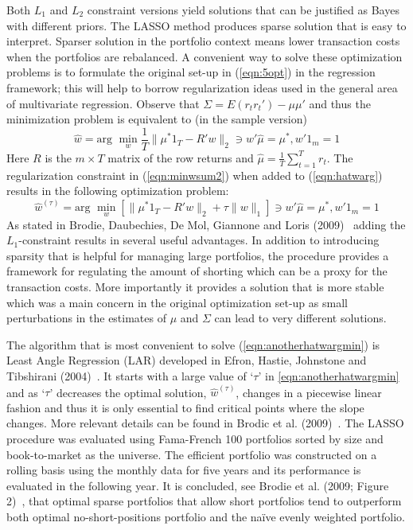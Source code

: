 Both $L_1$ and $L_2$ constraint versions yield solutions that can be justified as Bayes with different priors. The LASSO method produces sparse solution that is easy to interpret. Sparser solution in the portfolio context means lower transaction costs when the portfolios are rebalanced. A convenient way to solve these optimization problems is to formulate the original set-up in (\ref{eqn:5opt}) in the regression framework; this will help to borrow regularization ideas used in the general area of multivariate regression. Observe that $\Sigma=E(r_tr_t') - \mu\mu'$ and thus the minimization problem is equivalent to (in the sample version)
	\begin{equation}\label{eqn:hatwarg}
	\hat{w}= \text{arg }\min_w \dfrac{1}{T} \| \mu^*1_T - R'w\|_2 \ni w'\hat{\mu} = \mu^*, w'1_m=1
	\end{equation}
Here $R$ is the $m\times T$ matrix of the row returns and $\hat{\mu}=\frac{1}{T}\sum_{t=1}^T r_t$. The regularization constraint in (\ref{eqn:minwsum2}) when added to (\ref{eqn:hatwarg}) results in the following optimization problem:
	\begin{equation}\label{eqn:anotherhatwargmin}
	\hat{w}^{(\tau)}= \text{arg } \min_w [ \|\mu^* 1_T - R'w\|_2 + \tau\|w\|_1] \ni w' \hat{\mu} = \mu^*, w'1_m=1
	\end{equation}
As stated in Brodie, Daubechies, De Mol, Giannone and Loris (2009)~\cite{brodic} adding the $L_1$-constraint results in several useful advantages. In addition to introducing sparsity that is helpful for managing large portfolios, the procedure provides a framework for regulating the amount of shorting which can be a proxy for the transaction costs. More importantly it provides a solution that is more stable which was a main concern in the original optimization set-up as small perturbations in the estimates of $\mu$ and $\Sigma$ can lead to very different solutions.


The algorithm that is most convenient to solve (\ref{eqn:anotherhatwargmin}) is Least Angle Regression (LAR) developed in Efron, Hastie, Johnstone and Tibshirani (2004)~\cite{efron}. It starts with a large value of `$\tau$' in \eqref{eqn:anotherhatwargmin} and as `$\tau$' decreases the optimal solution, $\hat{w}^{(\tau)}$, changes in a piecewise linear fashion and thus it is only essential to find critical points where the slope changes. More relevant details can be found in Brodic et al. (2009)~\cite{brodic}. The LASSO procedure was evaluated using Fama-French 100 portfolios sorted by size and book-to-market as the universe. The efficient portfolio was constructed on a rolling basis using the monthly data for five years and its performance is evaluated in the following year. It is concluded, see Brodie et al. (2009; Figure 2)~\cite{brodic}, that optimal sparse portfolios that allow short portfolios tend to outperform both optimal no-short-positions portfolio and the na\"ive evenly weighted portfolio. 



